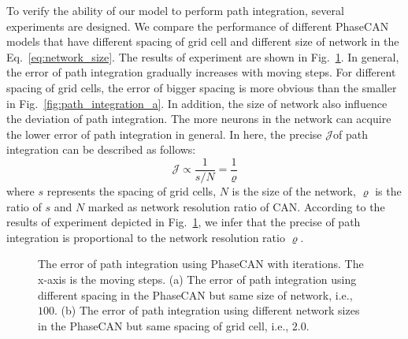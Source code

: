 \documentclass[final,5p,times,twocolumn,authoryear]{elsarticle}
\begin{document}
To verify the ability of our model to perform path integration, several experiments are designed. We compare the performance of different PhaseCAN models that have different spacing of grid cell and different size of network in the Eq.~\eqref{eq:network_size}. The results of experiment are shown in Fig.~\ref{fig:path_integration}. In general, the error of path integration gradually increases with moving steps. For different spacing of grid cells, the error of bigger spacing is more obvious than the smaller in Fig.~\ref{fig:path_integration_a}. In addition, the size of network also influence the 
deviation of path integration. The more neurons in the network can acquire the lower error of path integration in general. In here, the precise $\mathcal{J}$of path integration can be described as follows:
\begin{equation}\label{eq:relation_precise}
	\mathcal{J} \varpropto \frac{1}{s/N} = \frac{1}{\varrho}
\end{equation}
where $s$ represents the spacing of grid cells, $N$ is the size of the network, $\varrho$ is the ratio of $s$ and $N$ marked as network resolution ratio of CAN. According to the results of experiment depicted in Fig.~\ref{fig:path_integration}, we infer that the precise of path integration is proportional to the network resolution ratio $\varrho$. 

\begin{figure}[!t]
	\centering

	\vspace{-10pt}
	
	\caption{The error of path integration using PhaseCAN with iterations. The x-axis is the moving steps. (a) The error of path integration using different spacing in the PhaseCAN but same size of network, i.e., $100$. (b) The error of path integration using different network sizes in the PhaseCAN but same spacing of grid cell, i.e., $2.0$. }
	\label{fig:path_integration}
\end{figure}
\end{document}
